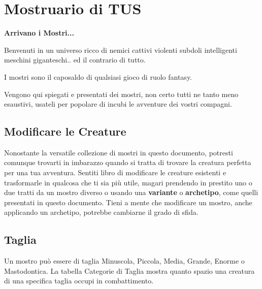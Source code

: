 
\section{Mostruario di TUS}

\textbf{Arrivano i Mostri...}

Benvenuti in un universo ricco di nemici cattivi violenti subdoli intelligenti meschini giganteschi.. ed il contrario di tutto.

I mostri sono il caposaldo di qualsiasi gioco di ruolo fantasy.

Vengono qui spiegati e presentati dei mostri, non certo tutti ne tanto meno esaustivi, usateli per popolare di incubi le avventure dei vostri compagni.

\subsection{Modificare le Creature}

Nonostante la versatile collezione di mostri in questo documento, potresti comunque trovarti in imbarazzo quando si tratta di trovare la creatura perfetta per una tua avventura. Sentiti libro di modificare le creature esistenti e trasformarle in qualcosa che ti sia più utile, magari prendendo in prestito uno o due tratti da un mostro diverso o usando una \textbf{variante} o \textbf{archetipo}, come quelli presentati in questo documento. Tieni a mente che modificare un mostro, anche applicando un archetipo, potrebbe cambiarne il grado di sfida. 

\subsection{Taglia}

Un mostro può essere di taglia Minuscola, Piccola, Media, Grande, Enorme o Mastodontica. La tabella Categorie di Taglia mostra quanto spazio una creatura di una specifica taglia occupi in combattimento.

